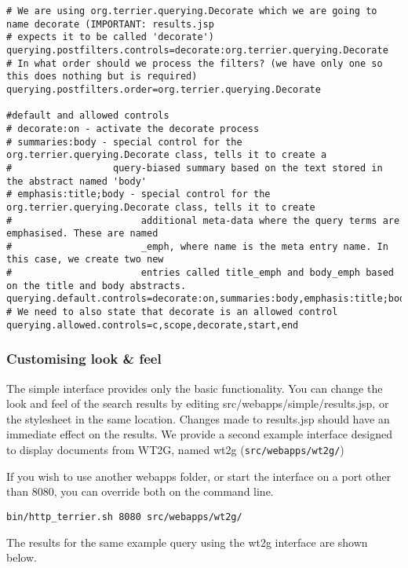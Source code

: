 \begin{verbatim}
# We are using org.terrier.querying.Decorate which we are going to name decorate (IMPORTANT: results.jsp
# expects it to be called 'decorate')
querying.postfilters.controls=decorate:org.terrier.querying.Decorate
# In what order should we process the filters? (we have only one so this does nothing but is required)
querying.postfilters.order=org.terrier.querying.Decorate

#default and allowed controls
# decorate:on - activate the decorate process
# summaries:body - special control for the org.terrier.querying.Decorate class, tells it to create a
#                  query-biased summary based on the text stored in the abstract named 'body'
# emphasis:title;body - special control for the org.terrier.querying.Decorate class, tells it to create
#                       additional meta-data where the query terms are emphasised. These are named
#                       _emph, where name is the meta entry name. In this case, we create two new
#                       entries called title_emph and body_emph based on the title and body abstracts. 
querying.default.controls=decorate:on,summaries:body,emphasis:title;body
# We need to also state that decorate is an allowed control
querying.allowed.controls=c,scope,decorate,start,end
\end{verbatim}

\subsubsection{Customising look \& feel}\label{customising-look-feel}

The simple interface provides only the basic functionality. You can
change the look and feel of the search results by editing
src/webapps/simple/results.jsp, or the stylesheet in the same location.
Changes made to results.jsp should have an immediate effect on the
results. We provide a second example interface designed to display
documents from WT2G, named wt2g (\texttt{src/webapps/wt2g/})

If you wish to use another webapps folder, or start the interface on a
port other than 8080, you can override both on the command line.

\begin{verbatim}
bin/http_terrier.sh 8080 src/webapps/wt2g/
\end{verbatim}

The results for the same example query using the wt2g interface are
shown below.

